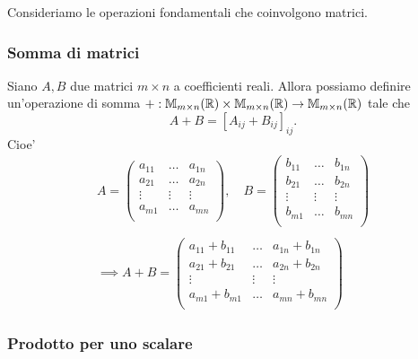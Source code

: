 Consideriamo le operazioni fondamentali che coinvolgono matrici.

\subsubsection{Somma di matrici}

Siano $A, B$ due matrici $m \times n$ a coefficienti reali. Allora possiamo definire un'operazione di somma $+ : \mathbb{M}_{m \times n}(\mathbb{R}) \times \mathbb{M}_{m \times n}(\mathbb{R}) \to \mathbb{M}_{m \times n}(\mathbb{R})$ tale che \begin{equation}
    A + B = [A_{ij} + B_{ij}]_{ij}.
\end{equation}
Cioe' \begin{gather*}
    A = \begin{pmatrix}
        a_{11}  & \dots     & a_{1n} \\
        a_{21}  & \dots     & a_{2n} \\
        \vdots  & \vdots    & \vdots \\
        a_{m1}  & \dots     & a_{mn} \\
    \end{pmatrix},\quad
    B = \begin{pmatrix}
        b_{11}  & \dots     & b_{1n} \\
        b_{21}  & \dots     & b_{2n} \\
        \vdots  & \vdots    & \vdots \\
        b_{m1}  & \dots     & b_{mn} \\
    \end{pmatrix} \\
    \\
    \implies
    A + B = \begin{pmatrix}
        a_{11} + b_{11}  & \dots     & a_{1n} + b_{1n} \\
        a_{21} + b_{21}  & \dots     & a_{2n} + b_{2n} \\
        \vdots           & \vdots    & \vdots          \\
        a_{m1} + b_{m1}  & \dots     & a_{mn} + b_{mn} \\
    \end{pmatrix}   
\end{gather*}

\subsubsection{Prodotto per uno scalare}

